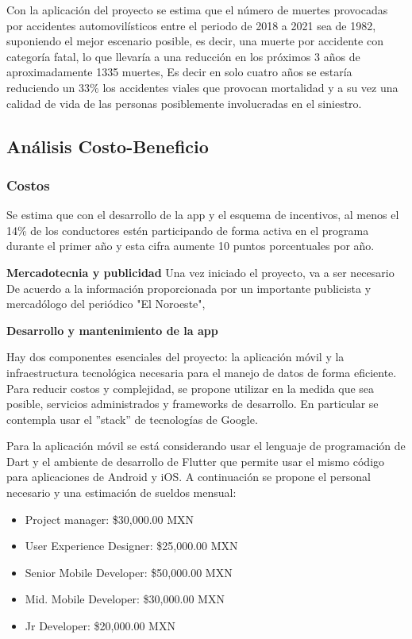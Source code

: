 \documentclass{article}
\begin{document}
Con la aplicación del proyecto se estima que el número de muertes provocadas por accidentes automovilísticos entre el periodo de 2018 a 2021 sea de 1982, suponiendo el mejor escenario posible, es decir, una muerte por accidente con categoría fatal, lo que llevaría a una reducción en los próximos 3 años de aproximadamente 1335 muertes, Es decir en solo cuatro años se estaría reduciendo un 33\% los accidentes viales que provocan mortalidad y a su vez una calidad de vida de las personas posiblemente involucradas en el siniestro.


\subsection{Análisis Costo-Beneficio}
% 
% 


\subsubsection{Costos}

Se estima que con el desarrollo de la app y el esquema de incentivos, al menos el 14\% de los conductores
estén participando de forma activa en el programa durante el primer año y esta cifra aumente 10 puntos porcentuales
por año. 

\textbf{Mercadotecnia y publicidad}
Una vez iniciado el proyecto, va a ser necesario 
De acuerdo a la información proporcionada por un importante publicista y mercadólogo del periódico "El Noroeste", 

\textbf{Desarrollo y mantenimiento de la app}

Hay dos componentes esenciales del proyecto: la aplicación móvil y la infraestructura tecnológica necesaria para
el manejo de datos de forma eficiente. Para reducir costos y complejidad, se propone utilizar en la medida que sea
posible, servicios administrados y frameworks de desarrollo. En particular se contempla usar el ''stack'' de tecnologías
de Google. 

Para la aplicación móvil se está considerando usar el lenguaje de programación de Dart y el ambiente de desarrollo de 
Flutter que permite usar el mismo código para aplicaciones de Android y iOS. A continuación se propone el personal necesario y una estimación de sueldos mensual:  
\begin{itemize}
\item Project manager: \$30,000.00 MXN
\item User Experience Designer: \$25,000.00 MXN
\item Senior Mobile Developer: \$50,000.00 MXN
\item Mid. Mobile Developer: \$30,000.00 MXN
\item Jr Developer: \$20,000.00 MXN
\end{itemize}
\end{document}
